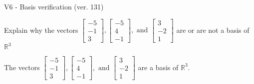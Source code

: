 \begin{exercise}
  \begin{exerciseTitle}V6 - Basis verification (ver. 131)\end{exerciseTitle}
  \begin{exerciseStatement}
    Explain why the vectors \(\left[\begin{array}{r}
-5 \\
-1 \\
3
\end{array}\right] , \left[\begin{array}{r}
-5 \\
4 \\
-1
\end{array}\right] , \text{ and } \left[\begin{array}{r}
3 \\
-2 \\
1
\end{array}\right]\) are or are not a basis of \(\mathbb{R}^3\)	


  \end{exerciseStatement}
  \begin{exerciseAnswer}
   The vectors \(\left[\begin{array}{r}
-5 \\
-1 \\
3
\end{array}\right] , \left[\begin{array}{r}
-5 \\
4 \\
-1
\end{array}\right] , \text{ and } \left[\begin{array}{r}
3 \\
-2 \\
1
\end{array}\right]\) 
  	 are  a basis of \(\mathbb{R}^3\).
  


  \end{exerciseAnswer}
\end{exercise}